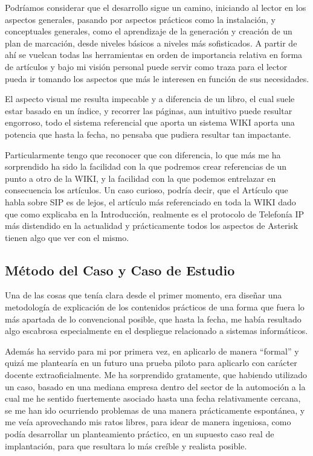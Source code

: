 Podríamos considerar que el desarrollo sigue un camino, iniciando al lector en los aspectos generales, pasando por aspectos prácticos como la instalación, y conceptuales generales, como el aprendizaje de la generación y creación de un plan de marcación, desde niveles básicos a niveles más sofisticados. A partir de ahí se vuelcan todas las herramientas en orden de importancia relativa en forma de artículos y bajo mi visión personal puede servir como traza para el lector pueda ir tomando los aspectos que más le interesen en función de sus necesidades.

El aspecto visual me resulta impecable y a diferencia de un libro, el cual suele estar basado en un índice, y recorrer las páginas, aun intuitivo puede resultar engorroso, todo el sistema referencial que aporta un sistema WIKI aporta una potencia que hasta la fecha, no pensaba que pudiera resultar tan impactante. 

Particularmente tengo que reconocer que con diferencia, lo que más me ha sorprendido ha sido la facilidad con la que podremos crear referencias de un punto a otro de la WIKI, y la facilidad con la que podemos entrelazar en consecuencia los artículos. Un caso curioso, podría decir, que el Artículo que habla sobre SIP es de lejos, el artículo más referenciado en toda la WIKI dado que como explicaba en la Introducción, realmente es el protocolo de Telefonía IP más distendido en la actualidad y prácticamente todos los aspectos de Asterisk tienen algo que ver con el mismo.

\subsection{Método del Caso y Caso de Estudio}

Una de las cosas que tenía clara desde el primer momento, era diseñar una metodología de explicación de los contenidos prácticos de una forma que fuera lo más apartada de lo convencional posible, que hasta la fecha, me había resultado algo escabrosa especialmente en el despliegue relacionado a sistemas informáticos.

Además ha servido para mi por primera vez, en aplicarlo de manera ``formal'' y quizá me plantearía en un futuro una prueba piloto para aplicarlo con carácter docente extraoficialmente. Me ha sorprendido gratamente, que habiendo utilizado un caso, basado en una mediana empresa dentro del sector de la automoción a la cual me he sentido fuertemente asociado hasta una fecha relativamente cercana, se me han ido ocurriendo problemas de una manera prácticamente espontánea, y me veía aprovechando mis ratos libres, para idear de manera ingeniosa, como podía desarrollar un planteamiento práctico, en un supuesto caso real de implantación, para que resultara lo más creíble y realista posible.

